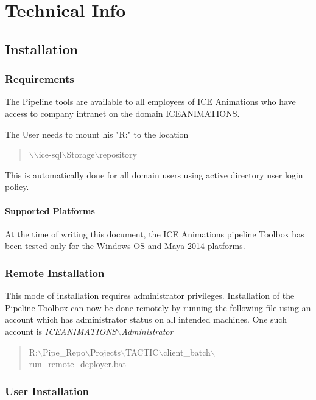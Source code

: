 \chapter{Technical Info}

\section{Installation}
\label{sec:installation}

\subsection{Requirements}

The Pipeline tools are available to all employees of ICE Animations who have
access to company intranet on the domain ICEANIMATIONS.

The User needs to mount his "R:" to the location 
\begin{quote}
$\backslash$$\backslash$ice-sql$\backslash$Storage$\backslash$repository
\end{quote}

This is automatically done for all domain users using active directory user
login policy.


\subsubsection{Supported Platforms} 

At the time of writing this document, the ICE Animations pipeline Toolbox has
been tested only for the Windows OS and Maya 2014 platforms.


\subsection{Remote Installation}

This mode of installation requires administrator privileges. Installation of
the Pipeline Toolbox can now be done remotely by running the following file
using an account which has administrator status on all intended machines. One
such account is \emph{ICEANIMATIONS$\backslash$Administrator}

\begin{quote}
R:$\backslash$Pipe\_Repo$\backslash$Projects$\backslash$TACTIC$\backslash$client\_batch$\backslash$run\_remote\_deployer.bat
\end{quote}

\subsection{User Installation}

